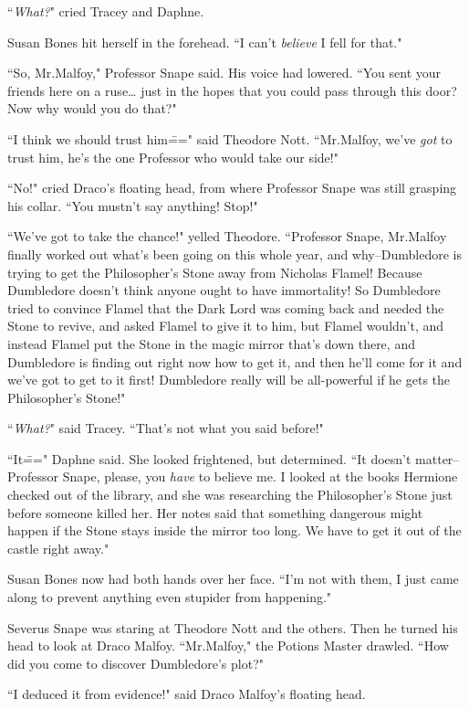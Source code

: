 ``\emph{What?}" cried Tracey and Daphne.

Susan Bones hit herself in the forehead. ``I can't \emph{believe} I fell for that."

``So, Mr.\?Malfoy," Professor Snape said. His voice had lowered. ``You sent your friends here on a ruse{\ldots} just in the hopes that you could pass through this door? Now why would you do that?"

``I think we should trust him\===" said Theodore Nott. ``Mr.\?Malfoy, we've \emph{got} to trust him, he's the one Professor who would take our side!"

``No!" cried Draco's floating head, from where Professor Snape was still grasping his collar. ``You mustn't say anything! Stop!"

``We've got to take the chance!" yelled Theodore. ``Professor Snape, Mr.\?Malfoy finally worked out what's been going on this whole year, and why\---Dumbledore is trying to get the Philosopher's Stone away from Nicholas Flamel! Because Dumbledore doesn't think anyone ought to have immortality! So Dumbledore tried to convince Flamel that the Dark Lord was coming back and needed the Stone to revive, and asked Flamel to give it to him, but Flamel wouldn't, and instead Flamel put the Stone in the magic mirror that's down there, and Dumbledore is finding out right now how to get it, and then he'll come for it and we've got to get to it first! Dumbledore really will be all-powerful if he gets the Philosopher's Stone!"

``\emph{What?}" said Tracey. ``That's not what you said before!"

``It\===" Daphne said. She looked frightened, but determined. ``It doesn't matter\---Professor Snape, please, you \emph{have} to believe me. I looked at the books Hermione checked out of the library, and she was researching the Philosopher's Stone just before someone killed her. Her notes said that something dangerous might happen if the Stone stays inside the mirror too long. We have to get it out of the castle right away."

Susan Bones now had both hands over her face. ``I'm not with them, I just came along to prevent anything even stupider from happening."

Severus Snape was staring at Theodore Nott and the others. Then he turned his head to look at Draco Malfoy. ``Mr.\?Malfoy," the Potions Master drawled. ``How did you come to discover Dumbledore's plot?"

``I deduced it from evidence!" said Draco Malfoy's floating head.

